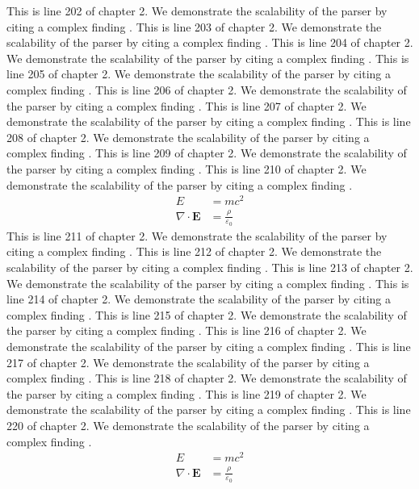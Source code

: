This is line 202 of chapter 2. We demonstrate the scalability of the parser by citing a complex finding \cite{ref2_202}.
This is line 203 of chapter 2. We demonstrate the scalability of the parser by citing a complex finding \cite{ref2_203}.
This is line 204 of chapter 2. We demonstrate the scalability of the parser by citing a complex finding \cite{ref2_204}.
This is line 205 of chapter 2. We demonstrate the scalability of the parser by citing a complex finding \cite{ref2_205}.
This is line 206 of chapter 2. We demonstrate the scalability of the parser by citing a complex finding \cite{ref2_206}.
This is line 207 of chapter 2. We demonstrate the scalability of the parser by citing a complex finding \cite{ref2_207}.
This is line 208 of chapter 2. We demonstrate the scalability of the parser by citing a complex finding \cite{ref2_208}.
This is line 209 of chapter 2. We demonstrate the scalability of the parser by citing a complex finding \cite{ref2_209}.
This is line 210 of chapter 2. We demonstrate the scalability of the parser by citing a complex finding \cite{ref2_210}.
\begin{align*}
  E &= mc^2 \\
  \nabla \cdot \mathbf{E} &= \frac{\rho}{\varepsilon_0}
\end{align*}
This is line 211 of chapter 2. We demonstrate the scalability of the parser by citing a complex finding \cite{ref2_211}.
This is line 212 of chapter 2. We demonstrate the scalability of the parser by citing a complex finding \cite{ref2_212}.
This is line 213 of chapter 2. We demonstrate the scalability of the parser by citing a complex finding \cite{ref2_213}.
This is line 214 of chapter 2. We demonstrate the scalability of the parser by citing a complex finding \cite{ref2_214}.
This is line 215 of chapter 2. We demonstrate the scalability of the parser by citing a complex finding \cite{ref2_215}.
This is line 216 of chapter 2. We demonstrate the scalability of the parser by citing a complex finding \cite{ref2_216}.
This is line 217 of chapter 2. We demonstrate the scalability of the parser by citing a complex finding \cite{ref2_217}.
This is line 218 of chapter 2. We demonstrate the scalability of the parser by citing a complex finding \cite{ref2_218}.
This is line 219 of chapter 2. We demonstrate the scalability of the parser by citing a complex finding \cite{ref2_219}.
This is line 220 of chapter 2. We demonstrate the scalability of the parser by citing a complex finding \cite{ref2_220}.
\begin{align*}
  E &= mc^2 \\
  \nabla \cdot \mathbf{E} &= \frac{\rho}{\varepsilon_0}
\end{align*}
